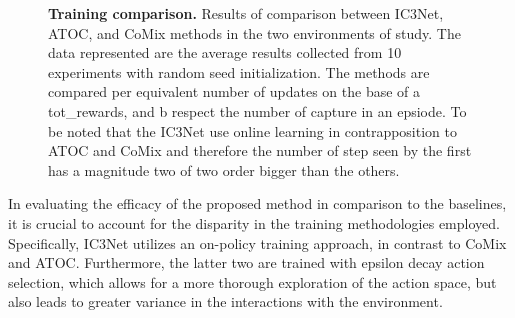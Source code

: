 \documentclass[a4paper,singleside,12pt]{report} %
\begin{document}
\begin{figure}
  \centering
  \hfill
  \caption{\textbf{Training comparison.} Results of comparison between IC3Net, ATOC, and CoMix methods in the two environments of study. The data represented are the average results collected from 10 experiments with random seed initialization. The methods are compared per equivalent number of updates on the base of a tot_rewards, and b respect the number of capture in an epsiode. To be noted that the IC3Net use online learning in contrapposition to ATOC and CoMix and therefore the number of step seen by the first has a magnitude two of two order bigger than the others.}
  \label{fig:training}
\end{figure}


In evaluating the efficacy of the proposed method in comparison to the baselines, it is crucial to account for the disparity in the training methodologies employed. Specifically, IC3Net utilizes an on-policy training approach, in contrast to CoMix and ATOC. Furthermore, the latter two are trained with epsilon decay action selection, which allows for a more thorough exploration of the action space, but also leads to greater variance in the interactions with the environment.
\end{document}

